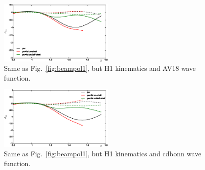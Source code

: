 \begin{figure}[htb]
\begin{center}
  \includegraphics[width=0.5\textwidth]{figs/beampol_av18_kin1.eps}
\caption{Same as Fig.~\ref{fig:beampol1}, but H1 kinematics and AV18 wave 
function.}
\label{fig:beampol3}       %
\end{center}
\end{figure}

\begin{figure}[htb]
\begin{center}
  \includegraphics[width=0.5\textwidth]{figs/beampol_cdbonn_kin1.eps}
\caption{Same as Fig.~\ref{fig:beampol1}, but H1 kinematics and cdbonn wave 
function.}
\label{fig:beampol4}       %
\end{center}
\end{figure}


